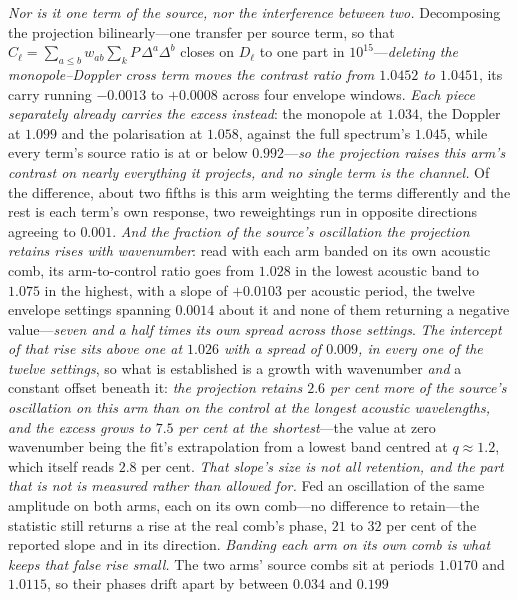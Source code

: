 \documentclass[11pt,a4paper]{article}
\theoremstyle{plain}
\theoremstyle{definition}
\theoremstyle{remark}
\begin{document}
\emph{Nor is it one term of the source, nor the interference between two.} Decomposing the projection
bilinearly---one transfer per source term, so that $C_\ell=\sum_{a\le b}w_{ab}\sum_k P\,\Delta^a\Delta^b$
closes on $D_\ell$ to one part in $10^{15}$---\emph{deleting the monopole--Doppler cross term moves the
contrast ratio from $1.0452$ to $1.0451$}, its carry running $-0.0013$ to $+0.0008$ across four envelope
windows. \emph{Each piece separately already carries the excess instead}: the monopole at $1.034$, the
Doppler at $1.099$ and the polarisation at $1.058$, against the full spectrum's $1.045$, while every term's
source ratio is at or below $0.992$---\emph{so the projection raises this arm's contrast on nearly
everything it projects, and no single term is the channel.} Of the difference, about two fifths is this arm
weighting the terms differently and the rest is each term's own response, two reweightings run in opposite
directions agreeing to $0.001$. \emph{And the fraction of the source's oscillation the projection retains
rises with wavenumber}: read with each arm banded on its own acoustic comb, its arm-to-control ratio goes from
$1.028$ in the lowest acoustic band to $1.075$ in the highest, with a slope of $+0.0103$ per acoustic period,
the twelve envelope settings spanning $0.0014$ about it and none of them returning a negative
value---\emph{seven and a half times its own spread across those settings}. \emph{The intercept of that rise
sits above one at $1.026$ with a spread of $0.009$, in every one of the twelve settings},
so what is established is a growth with wavenumber \emph{and} a constant offset beneath it: \emph{the
projection retains $2.6$ per cent more of the source's oscillation on this arm than on the control at the
longest acoustic wavelengths, and the excess grows to $7.5$ per cent at the shortest}---the value at zero
wavenumber being the fit's extrapolation from a lowest band centred at $q\approx1.2$, which itself reads
$2.8$ per cent.
\emph{That slope's size is not all retention, and the part that is not is measured rather than allowed for.}
Fed an oscillation of the same amplitude on both arms, each on its own comb---no difference to retain---the
statistic still returns a rise at the real comb's phase, $21$ to $32$ per cent of the reported slope and in
its direction. \emph{Banding each arm on its own comb is what keeps that false rise small.} The two arms'
source combs sit at periods $1.0170$ and $1.0115$, so their phases drift apart by between $0.034$ and $0.199$
\end{document}
